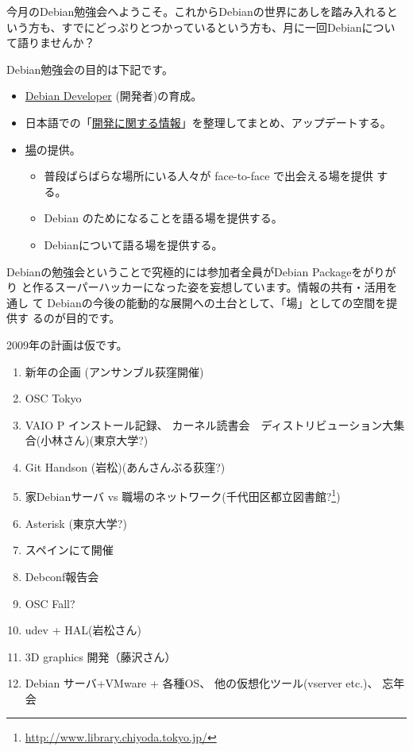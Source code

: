 \documentclass[mingoth,a4paper]{jsarticle}
\begin{document}
\begin{multicols}{2}
 
 
 今月のDebian勉強会へようこそ。これからDebianの世界にあしを踏み入れると
 いう方も、すでにどっぷりとつかっているという方も、月に一回Debianについ
 て語りませんか？

 Debian勉強会の目的は下記です。

 \begin{itemize}
 \item \underline{Debian Developer} (開発者)の育成。
 \item 日本語での「\underline{開発に関する情報}」を整理してまとめ、アップデートする。
 \item \underline{場}の提供。
 \begin{itemize}
  \item 普段ばらばらな場所にいる人々が face-to-face で出会える場を提供
	する。
  \item Debian のためになることを語る場を提供する。
  \item Debianについて語る場を提供する。
 \end{itemize}
 \end{itemize}		

 Debianの勉強会ということで究極的には参加者全員がDebian Packageをがりがり
 と作るスーパーハッカーになった姿を妄想しています。情報の共有・活用を通し
 て Debianの今後の能動的な展開への土台として、「場」としての空間を提供す
 るのが目的です。

 2009年の計画は仮です。

 \begin{enumerate}
  \item 新年の企画 (アンサンブル荻窪開催)
  \item OSC Tokyo
  \item VAIO P インストール記録、
	カーネル読書会　ディストリビューション大集合(小林さん)(東京大学?)
  \item Git Handson (岩松)(あんさんぶる荻窪?)
  \item 家Debianサーバ vs 職場のネットワーク(千代田区都立図書館?\footnote{\url{http://www.library.chiyoda.tokyo.jp/}})
  \item Asterisk (東京大学?)
  \item スペインにて開催
  \item Debconf報告会
  \item OSC Fall?
  \item udev + HAL(岩松さん)
  \item 3D graphics 開発（藤沢さん） 
  \item Debian サーバ+VMware + 各種OS、
	他の仮想化ツール(vserver etc.)、
	忘年会
 \end{enumerate}


\end{multicols}
\end{document}
